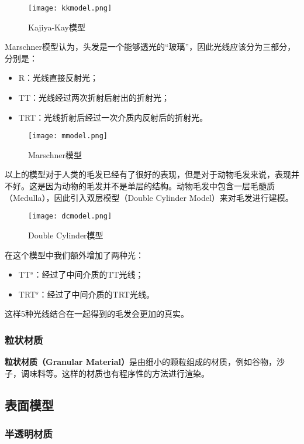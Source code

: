 \documentclass[openany]{progbookcn}
\begin{document}
\begin{figure}[H]
	\centering
	\texttt{[image: kkmodel.png]}
	\caption{Kajiya-Kay模型}
	\label{fig:kk}
\end{figure}

Marschner模型认为，头发是一个能够透光的``玻璃”，因此光线应该分为三部分，分别是：
\begin{itemize}
	\item R：光线直接反射光；
	\item TT：光线经过两次折射后射出的折射光；
	\item TRT：光线折射后经过一次介质内反射后的折射光。
\end{itemize}

\begin{figure}[H]
	\centering
	\texttt{[image: mmodel.png]}
	\caption{Marschner模型}
	\label{fig:mm}
\end{figure}

以上的模型对于人类的毛发已经有了很好的表现，但是对于动物毛发来说，表现并不好。这是因为动物的毛发并不是单层的结构。动物毛发中包含一层毛髓质（Medulla），因此引入双层模型（Double Cylinder Model）来对毛发进行建模。

\begin{figure}[H]
	\centering
	\texttt{[image: dcmodel.png]}
	\caption{Double Cylinder模型}
	\label{fig:dc}
\end{figure}

在这个模型中我们额外增加了两种光：
\begin{itemize}
	\item TT$^s$：经过了中间介质的TT光线；
	\item TRT$^s$：经过了中间介质的TRT光线。
\end{itemize}

这样5种光线结合在一起得到的毛发会更加的真实。

\subsubsection{粒状材质}

\textbf{粒状材质（Granular Material）}是由细小的颗粒组成的材质，例如谷物，沙子，调味料等。这样的材质也有程序性的方法进行渲染。

\subsection{表面模型}

\subsubsection{半透明材质}
\end{document}
